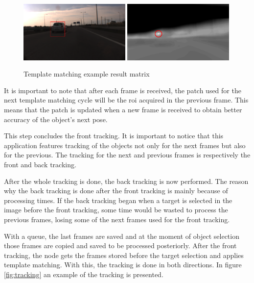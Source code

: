 \begin{figure}[htp]
	
	\centering
	\includegraphics[width=0.49\textwidth]{caplabel/imgs/resultmat.png}\hfill
	\includegraphics[width=0.49\textwidth]{caplabel/imgs/resultmat2.png}
	
	\caption{Template matching example result matrix}
	\label{fig:resultmat}
	
\end{figure}

It is important to note that after each frame is received, the patch used for the next template matching cycle will be the \gls{roi} acquired in the previous frame. This means that the patch is updated when a new frame is received to obtain better accuracy of the object's next pose. 

This step concludes the front tracking. It is important to notice that this application features tracking of the objects not only for the next frames but also for the previous. The tracking for the next and previous frames is respectively the front and back tracking.

After the whole tracking is done, the back tracking is now performed. The reason why the back tracking is done after the front tracking is mainly because of processing times. If the back tracking began when a target is selected in the image before the front tracking, some time would be wasted to process the previous frames, losing some of the next frames used for the front tracking. 

With a queue, the last frames are saved and at the moment of object selection those frames are copied and saved to be processed posteriorly. After the front tracking, the node gets the frames stored before the target selection and applies template matching. With this, the tracking is done in both directions. In figure \ref{fig:tracking} an example of the tracking is presented.


